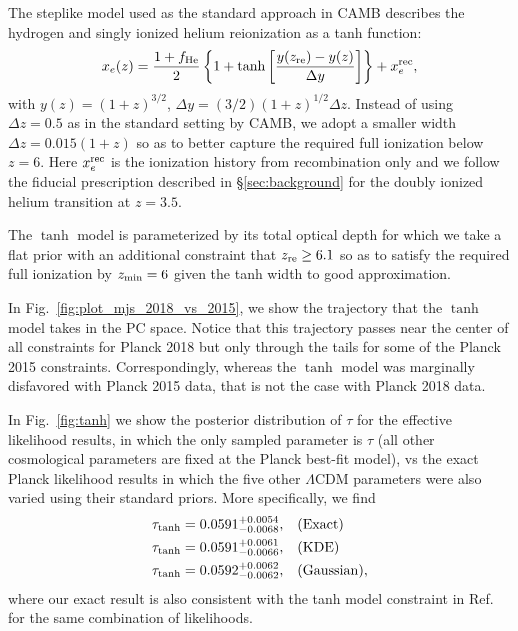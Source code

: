 \documentclass[prd,twocolumn,amsmath,amssymb,floatfix,superscriptaddress,nofootinbib]{revtex4-1}
\newcommand{\reffig}[1]{Fig.~\ref{fig:#1}}
\begin{document}
The steplike model used as the standard approach in CAMB describes the hydrogen and singly ionized helium reionization as a tanh function:
%
 \begin{equation}
x_e(z) = \frac{1+f_{\rm He}}{2}\left\{  1+ \tanh\left[ \frac{y(z_{\rm re})-y(z)}{\Delta y} \right] \right\} + x_e^{\rm rec},
 \label{eqn:tanh_1D}
 \end{equation}
 with $y(z)=(1+z)^{3/2}$, $\Delta y=(3/2)(1+z)^{1/2}\Delta z$. Instead of using $\Delta z = 0.5$ as in the standard setting by CAMB, we adopt a smaller width $\Delta z = 0.015(1+z)$ so as to better capture the required full ionization below $z=6$. Here $x_e^{\rm rec}$ is the ionization history from recombination only and we follow the fiducial prescription described in \S \ref{sec:background} for the 
 doubly ionized helium transition at $z=3.5$.
 

The $\tanh$ model is parameterized by its total optical depth for which we take a flat prior 
with an additional constraint that $z_{\rm re}\ge 6.1$ so as to  satisfy the  required full ionization by $z_{\rm min}=6$ given the tanh width to good approximation.

In Fig.~\ref{fig:plot_mjs_2018_vs_2015}, we show the trajectory that the $\tanh$ model takes in the PC space. Notice that this trajectory passes near the center of all constraints for Planck 2018 but only through the tails for some of the Planck 2015 constraints. Correspondingly, whereas the $\tanh$ model was marginally disfavored with Planck 2015 data, that is not the case with Planck 2018 data. 

 
In \reffig{tanh} we show the posterior distribution of $\tau$ for the effective likelihood results, in which the only sampled parameter is $\tau$ (all other cosmological parameters are fixed at the Planck best-fit model), vs the exact Planck likelihood results in which the five other $\Lambda$CDM parameters were also varied using their standard priors. More specifically, we find
%
\begin{align}
    \tau_{\mathrm{tanh}} = 0.0591_{-0.0068}^{+0.0054}, & \quad (\mathrm{Exact})\nonumber \\
    \tau_{\rm tanh} = 0.0591_{-0.0066}^{+0.0061}, & \quad  (\mathrm{KDE}) \nonumber \\
    \tau_{\rm tanh} = 0.0592_{-0.0062}^{+0.0062}, & \quad  (\mathrm{Gaussian}),
\end{align}
%
where our exact result is also consistent with the tanh model constraint in Ref.~\cite{Pagano:2019tci} for the same combination of likelihoods.
\end{document}

